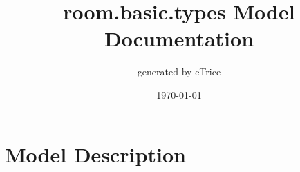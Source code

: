 \documentclass[titlepage]{article}
\title{room.basic.types Model Documentation}
\date{\today}
\author{generated by eTrice}
\begin{document}
\pagestyle{plain}
\maketitle
\tableofcontents

\newpage
\listoffigures
\newpage
\section{Model Description}
\end{document}
